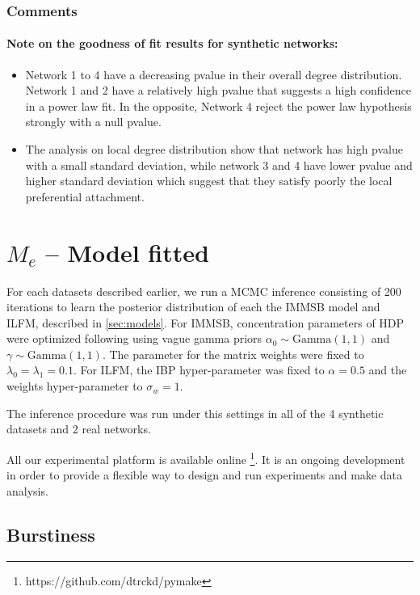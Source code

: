 \documentclass[a4paper, 12pt]{article}
\begin{document}
\subsubsection{Comments}

\paragraph{Note on the goodness of fit results for synthetic networks:}
\begin{itemize}
    \item Network 1 to 4 have a decreasing pvalue in their overall degree distribution. Network 1 and 2 have a relatively high pvalue that suggests a high confidence in a power law fit. In the opposite, Network 4 reject the power law hypothesis strongly with a null pvalue.
    \item The analysis on local degree distribution show that network has high pvalue with a small standard deviation, while network 3 and 4 have lower pvalue and higher standard deviation which suggest that they satisfy poorly the local preferential attachment.
\end{itemize}


\section{$M_e$ -- Model fitted}

For each datasets described earlier, we run a MCMC inference consisting of 200 iterations to learn the posterior distribution of each the IMMSB model and ILFM, described in \ref{sec:models}. For IMMSB, concentration parameters of HDP were optimized following \cite{HDP} using vague gamma priors $\alpha_0 \sim \text{Gamma}(1,1)$ and $\gamma \sim \text{Gamma}(1,1)$. The parameter for the matrix weights were fixed to $\lambda_0=\lambda_1=0.1$. For ILFM, the IBP hyper-parameter was fixed to $\alpha=0.5$ and the weights hyper-parameter to $\sigma_w = 1$. 

The inference procedure was run under this settings in all of the 4 synthetic datasets and 2 real networks.

All our experimental platform is available online \footnote{https://github.com/dtrckd/pymake}. It is an ongoing development in order to provide a flexible way to design and run experiments and make data analysis.

\subsection{Burstiness}
\end{document}
